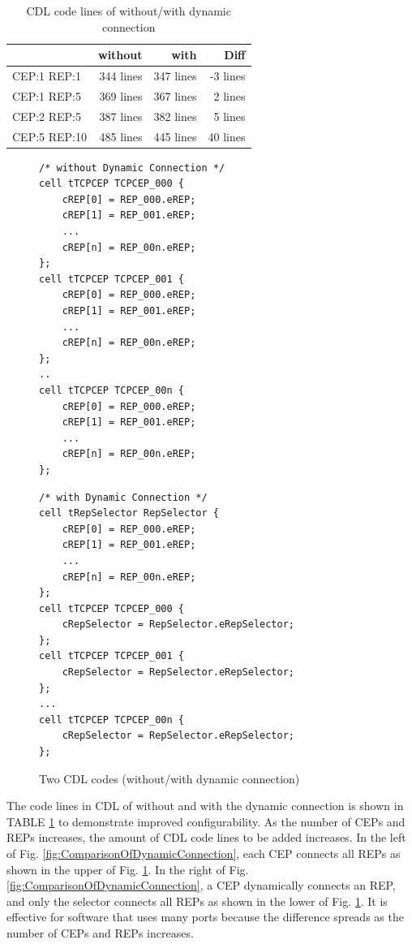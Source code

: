 \documentclass[a4j,12pt,oneside,openany,english]{jsbook}
\begin{document}
\begin{table}[t]
    \centering
    \caption{CDL code lines of without/with dynamic connection}
    \begin{tabular}{l|r|r|r}
        \hline\hline
                     &  without  &  with  &  Diff  \\ \hline
        CEP:1 REP:1  &  344 lines     &  347 lines  &  -3 lines   \\
        CEP:1 REP:5  &  369 lines     &  367 lines  &   2 lines   \\
        CEP:2 REP:5  &  387 lines     &  382 lines  &   5 lines   \\
        CEP:5 REP:10 &  485 lines     &  445 lines  &  40 lines   \\
        \hline
    \end{tabular}
    \label{tab:EvaluationOfConfigurabilityByDynamicConnection}
\end{table}

\begin{figure}[t]
 \begin{minipage}[t]{0.5\hsize}
  \centering
  \begin{lstlisting}
/* without Dynamic Connection */
cell tTCPCEP TCPCEP_000 {
    cREP[0] = REP_000.eREP;
    cREP[1] = REP_001.eREP;
    ...
    cREP[n] = REP_00n.eREP;
};
cell tTCPCEP TCPCEP_001 {
    cREP[0] = REP_000.eREP;
    cREP[1] = REP_001.eREP;
    ...
    cREP[n] = REP_00n.eREP;
};
..
cell tTCPCEP TCPCEP_00n {
    cREP[0] = REP_000.eREP;
    cREP[1] = REP_001.eREP;
    ...
    cREP[n] = REP_00n.eREP;
};
  \end{lstlisting}
 \end{minipage}
 \begin{minipage}[t]{0.5\hsize}
  \centering
  \begin{lstlisting}
/* with Dynamic Connection */
cell tRepSelector RepSelector {
    cREP[0] = REP_000.eREP;
    cREP[1] = REP_001.eREP;
    ...
    cREP[n] = REP_00n.eREP;
};
cell tTCPCEP TCPCEP_000 {
    cRepSelector = RepSelector.eRepSelector;
};
cell tTCPCEP TCPCEP_001 {
    cRepSelector = RepSelector.eRepSelector;
};
...
cell tTCPCEP TCPCEP_00n {
    cRepSelector = RepSelector.eRepSelector;
};
  \end{lstlisting}
 \end{minipage}
 \caption{Two CDL codes (without/with dynamic connection)}
 \label{src:ComparisonOfCDL}
\end{figure}

The code lines in CDL of without and with the dynamic connection is shown in TABLE \ref{tab:EvaluationOfConfigurabilityByDynamicConnection} to demonstrate improved configurability.
As the number of CEPs and REPs increases, the amount of CDL code lines to be added increases.
In the left of Fig. \ref{fig:ComparisonOfDynamicConnection}, each CEP connects all REPs as shown in the upper of Fig. \ref{src:ComparisonOfCDL}. 
In the right of Fig. \ref{fig:ComparisonOfDynamicConnection}, a CEP dynamically connects an REP, and only the selector connects all REPs as shown in the lower of Fig. \ref{src:ComparisonOfCDL}. 
It is effective for software that uses many ports because the difference spreads as the number of CEPs and REPs increases.
\end{document}
